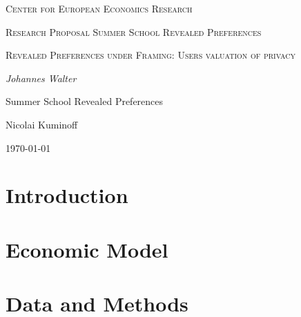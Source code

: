\documentclass[12pt,a4paper]{article}
\author{Johannes Walter}
\begin{document}
\begin{titlepage}
    \centering
    \vspace{5cm}
    {\scshape\Large Center for European Economics Research \par}
    \vspace{1cm}
    {\scshape\Large Research Proposal Summer School Revealed Preferences \par}
    \vspace{1.5cm}
    {\scshape\LARGE Revealed Preferences under Framing: Users valuation of privacy \par}
    \vspace{2cm}
    {\Large\itshape Johannes Walter \par}
    \vfill
    Summer School Revealed Preferences \par 
    Nicolai Kuminoff 
    \vfill

    {\large \today\par}
\end{titlepage}


\section{Introduction}


\section{Economic Model}


\section{Data and Methods}


\printbibliography
\end{document}
